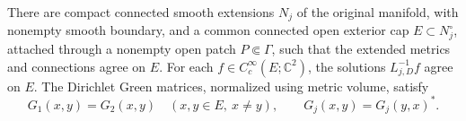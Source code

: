 \begin{proposition}\label{bdy:cap}
There are compact connected smooth extensions \(N_j\) of the original
manifold, with nonempty smooth boundary, and a common connected open
exterior cap \(E\subset N_j^\circ\), attached through a nonempty open
patch \(P\Subset\Gamma\), such that the extended metrics and
connections agree on \(E\).  For each
\(f\in C_c^\infty(E;\mathbb C^2)\), the solutions
\(L_{j,D}^{-1}f\) agree on \(E\).  The Dirichlet Green matrices,
normalized using metric volume, satisfy
\begin{equation}\label{bdy:common-green}
 G_1(x,y)=G_2(x,y)\quad(x,y\in E,\ x\ne y),
 \qquad G_j(x,y)=G_j(y,x)^*.
\end{equation}
\end{proposition}

